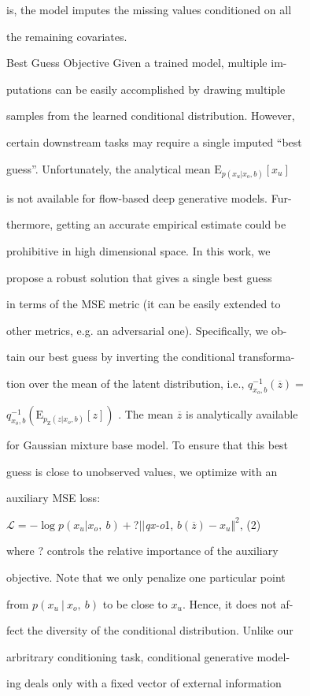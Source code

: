 \documentclass[a4paper,12pt]{article}
\begin{document}
is, the model imputes the missing values conditioned on all

the remaining covariates.

Best Guess Objective Given a trained model, multiple im-

putations can be easily accomplished by drawing multiple

samples from the learned conditional distribution. However,

certain downstream tasks may require a single imputed “best

guess”. Unfortunately, the analytical mean $\mathrm{E}_{p(x_{u}|x_{o},b)}[x_{u}]$

is not available for flow-based deep generative models. Fur-

thermore, getting an accurate empirical estimate could be

prohibitive in high dimensional space. In this work, we

propose a robust solution that gives a single best guess

in terms of the MSE metric (it can be easily extended to

other metrics, e.g. an adversarial one). Specifically, we ob-

tain our best guess by inverting the conditional transforma-

tion over the mean of the latent distribution, i.e., $q_{x_{o},b}^{-1}(\overline{z})=$

$q_{x_{o},b}^{-1}(\mathrm{E}_{p_{\mathrm{Z}}(z|x_{o},b)}[z])$ . The mean $\overline{z}$ is analytically available

for Gaussian mixture base model. To ensure that this best

guess is close to unobserved values, we optimize with an

auxiliary MSE loss:

$\mathcal{L}=-\log p(x_{u}|x_{o},\ b) +$?$||${\it qx-o}1, $b(\overline{z})-x_{u}\Vert^{2}$, (2)

where ? controls the relative importance of the auxiliary

objective. Note that we only penalize one particular point

from $p (x_{u}\ |\ x_{o},\ b)$ to be close to $x_{u}$. Hence, it does not af-

fect the diversity of the conditional distribution. Unlike our

arbritrary conditioning task, conditional generative model-

ing deals only with a fixed vector of external information
\end{document}
